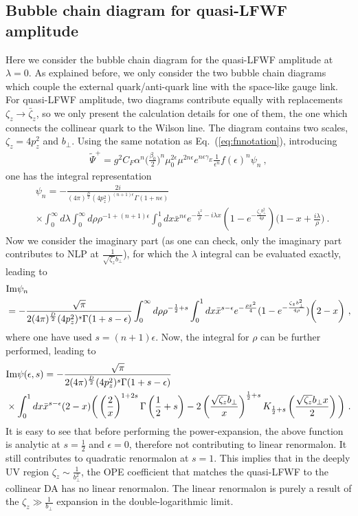 \documentclass[a4paper,11pt]{article}
\begin{document}
\subsection{Bubble chain diagram for quasi-LFWF amplitude}
Here we consider the bubble chain diagram for the quasi-LFWF amplitude at $\lambda=0$. As explained before, we only consider the two bubble chain diagrams which couple the external quark/anti-quark line with the space-like gauge link.  For quasi-LFWF amplitude, two diagrams contribute equally with replacements $\zeta_z \rightarrow \bar \zeta_z$, so we only present the calculation details for one of them, the one which connects the collinear quark to the Wilson line. The diagram contains two scales, $\zeta_z=4p_z^2$ and $b_\perp$. Using the same notation as Eq.~(\ref{eq:fnnotation}), introducing
\begin{align}
\tilde \Psi^+=g^2C_F\alpha^n\bigg(\frac{\beta_0}{2}\bigg)^n\mu_0^{2\epsilon}\mu^{2n\epsilon}e^{n\epsilon \gamma_E}\frac{1}{\epsilon^n}f(\epsilon)^n \psi_n \ ,
\end{align}
one has the integral representation
\begin{align}
&\psi_n=-\frac{2i}{(4\pi)^{\frac{D}{2}}(4p_z^2)^{(n+1)\epsilon}\Gamma(1+n\epsilon)}\nonumber \\ 
&\times\int_{0}^{\infty}d\lambda \int_{0}^{\infty} d\rho \rho^{-1+(n+1)\epsilon}\int_0^1dx \bar x^{n\epsilon}e^{-\frac{\lambda^2}{\rho}-i\lambda x} (1-e^{-\frac{\zeta_zb_\perp^2}{4\rho}})\bigg(1-x+\frac{i\lambda}{\rho}\bigg) \ .
\end{align}
Now we consider the imaginary part (as one can check, only the imaginary part contributes to NLP at $\frac{1}{\sqrt{\zeta_z}b_\perp}$), for which the $\lambda$ integral can be evaluated exactly, leading to 
\begin{align}\label{eq:Imfn}
&{\rm Im}\psi_n\nonumber\\&
=-\frac{\sqrt{\pi}}{2(4\pi)^{\frac{D}{2}}(4p_z^2)^{s}\Gamma(1+s-\epsilon)}\int_{0}^{\infty} d\rho \rho^{-\frac{1}{2}+s}\int_0^1dx \bar x^{s-\epsilon}e^{-\frac{\rho x^2}{4}} (1-e^{-\frac{\zeta_zb_\perp^2}{4\rho}})\bigg(2-x\bigg) \ ,
\end{align}
where one have used $s=(n+1)\epsilon$. Now, the integral for $\rho$ can be further performed, leading to 
\begin{align}
&{\rm Im}\psi(\epsilon,s)=-\frac{\sqrt{\pi}}{2(4\pi)^{\frac{D}{2}}(4p_z^2)^{s}\Gamma(1+s-\epsilon)}\nonumber \\ 
&\times\int_{0}^1dx \bar x^{s-\epsilon}(2-x)\bigg(\left(\frac{2}{x}\right)^{1+2s}\Gamma\left(\frac{1}{2}+s\right)-2\left(\frac{\sqrt{\zeta_z}b_\perp}{x}\right)^{\frac{1}{2}+s}K_{\frac{1}{2}+s}\left(\frac{\sqrt{\zeta_z}b_\perp x}{2}\right)\bigg) \ .
\end{align}
It is easy to see that before performing the power-expansion, the above function is analytic at $s=\frac{1}{2}$ and $\epsilon=0$, therefore not contributing to linear renormalon. It still contributes to quadratic renormalon at $s=1$. This implies that in the deeply UV region $\zeta_z\sim\frac{1}{b_\perp^2}$, the OPE coefficient that matches the quasi-LFWF to the collinear DA has no linear renormalon.  The linear renormalon is purely a result of the $\zeta_z\gg \frac{1}{b_\perp}$ expansion in the double-logarithmic limit.
\end{document}
